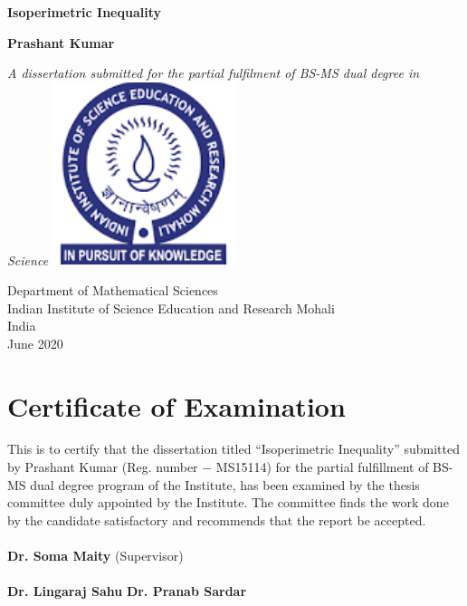 \documentclass[oneside]{book}
\date{\today}
\begin{document}
	
	\begin{titlepage}
		\begin{center}
			\vspace*{1cm}
			
			\Huge
			\textbf{Isoperimetric Inequality}
			
			\vspace{0.5cm}
			\LARGE
			
			
			\vspace{1.5cm}
			
			\textbf{Prashant Kumar}
			
			\vfill
			
			\textit{A dissertation submitted for the partial fulfilment of BS-MS dual degree in Science}          
			\vspace{0.9cm}
			\includegraphics[width=0.4\textwidth]{iiser logo.png}		
			
			\Large
			Department of Mathematical Sciences\\
			Indian Institute of Science Education and Research Mohali\\
			India\\
			June 2020
			
		\end{center}
	\end{titlepage}
	
	
	
	
	
	\tableofcontents
	
	
	\thispagestyle{empty}
	\chapter*{Certificate of Examination}
	
	This is to certify that the dissertation titled \enquote{Isoperimetric Inequality} submitted by Prashant Kumar (Reg. number $-$ MS15114) for the partial fulfillment of BS-MS dual degree program of the Institute, has been examined by the thesis committee duly appointed by the Institute. The committee finds the work done by the candidate satisfactory and recommends that the report be accepted.\\\\
	\textbf{Dr. Soma Maity} (Supervisor)\\
	\\
	\textbf{Dr. Lingaraj Sahu}  \hfill           \textbf{ Dr. Pranab Sardar}\\
	\\
	\\
	\thispagestyle{empty}
	
\end{document}
